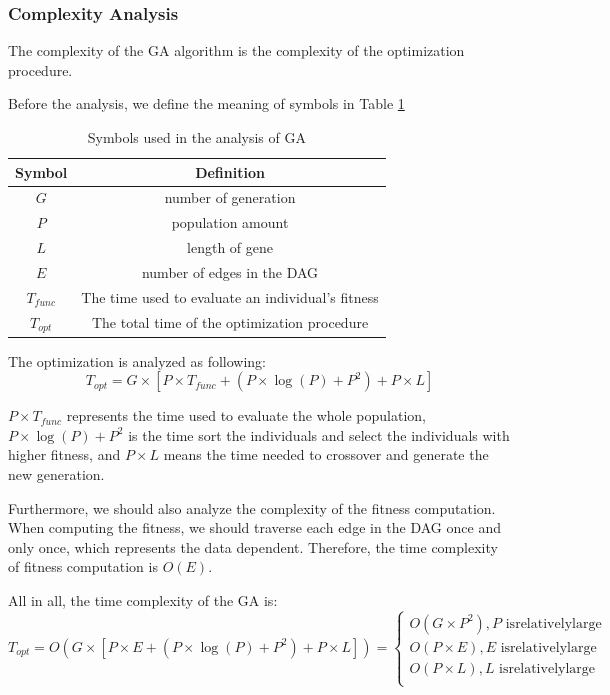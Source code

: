 \documentclass{llncs}
\begin{document}
\subsubsection{Complexity Analysis}
The complexity of the GA algorithm is the complexity of the optimization procedure.

Before the analysis, we define the meaning of symbols in Table \ref{tab:GA}
\begin{table}[]
    \centering
    \caption{Symbols used in the analysis of GA}
    \begin{tabular}{|c|c|}
    \hline
        {\bf Symbol} & {\bf Definition} \\ \hline
        $G$ & number of generation \\ \hline
        $P$ & population amount \\ \hline
        $L$ & length of gene \\ \hline
        $E$ & number of edges in the DAG \\ \hline
        $T_{func}$ & The time used to evaluate an individual's fitness \\ \hline
        $T_{opt}$  & The total time of the optimization procedure \\ \hline
    \end{tabular}
    \label{tab:GA}
\end{table}

The optimization is analyzed as following:
$$
T_{opt}=G\times \left[ P\times T_{func}+\left( P\times \log \left( P \right) +P^2 \right) +P\times L \right] 
$$

$P\times T_{func}$ represents the time used to evaluate the whole population, $P\times \log \left( P \right) +P^2$ is the time sort the individuals and select the individuals with higher fitness, and $P\times L$ means the time needed to crossover and generate the new generation.

Furthermore, we should also analyze the complexity of the fitness computation. When computing the fitness, we should traverse each edge in the DAG once and only once, which represents the data dependent. Therefore, the time complexity of fitness computation is $O(E)$.

All in all, the time complexity of the GA is:
$$
T_{opt}=O\left( G\times \left[ P\times E+\left( P\times \log \left( P \right) +P^2 \right) +P\times L \right] \right) =\begin{cases}
	O\left( G\times P^2 \right) , P\,\,\mathrm{is} \mathrm{relatively} \mathrm{large}\\
	O\left( P\times E \right) , E\,\,\mathrm{is} \mathrm{relatively} \mathrm{large}\\
	O\left( P\times L \right) , L\,\,\mathrm{is} \mathrm{relatively} \mathrm{large}\\
\end{cases}
$$
\end{document}
